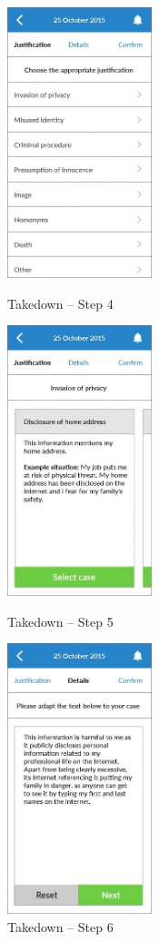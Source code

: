 \begin{figure}
  \subfigures
  \centering
  \begin{minipage}{4.6cm}
    \centering
    \includegraphics[width=4.2cm]{inc/ui_takedown_step4.jpg}
    \caption{Takedown -- Step 4}
    \label{fig:ui_takedown_step4}
  \end{minipage}
  \begin{minipage}{4.6cm}
    \centering
    \includegraphics[width=4.2cm]{inc/ui_takedown_step5.jpg}
    \caption{Takedown -- Step 5}
    \label{fig:ui_takedown_step5}
  \end{minipage}
  \begin{minipage}{4.6cm}
    \centering
    \includegraphics[width=4.2cm]{inc/ui_takedown_step6.jpg}
    \caption{Takedown -- Step 6}
    \label{fig:ui_takedown_step6}
  \end{minipage}
\end{figure}

